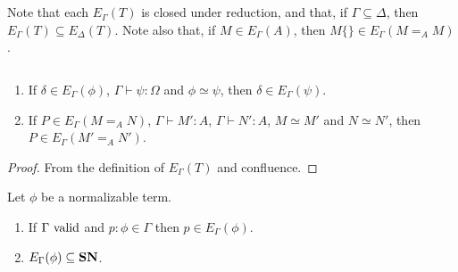 {\begin{code}
\\
\>[11]\<[19]%
\>[19]   \AgdaSymbol{(} \AgdaSymbol{:}   \AgdaSymbol{)} \AgdaSymbol{(} \AgdaSymbol{:}  \AgdaSymbol{)}                   \AgdaSymbol{(} \AgdaSymbol{(}   \AgdaSymbol{)} \AgdaSymbol{))} \<%
\\
\>[11]\<[19]%
\>[19]  \AgdaSymbol{(}  \AgdaSymbol{)} \<%
\end{code}
}

Note that each $E_\Gamma(T)$ is closed under reduction, and that, if $\Gamma \subseteq \Delta$, then $E_\Gamma(T) \subseteq E_\Delta(T)$.  Note also that, if $M \in E_\Gamma(A)$,
then $M \{\} \in E_\Gamma(M =_A M)$.

\begin{lm}$ $
\label{lm:conv-compute}
\begin{enumerate}
\item
If $\delta \in E_\Gamma(\phi)$, $\Gamma \vdash \psi : \Omega$ and $\phi \simeq \psi$, then $\delta \in E_\Gamma(\psi)$.
\item
If $P \in E_\Gamma(M =_A N)$, $\Gamma \vdash M' : A$, $\Gamma \vdash N' : A$, $M \simeq M'$ and $N \simeq N'$,
then $P \in E_\Gamma(M' =_A N')$.
\end{enumerate}
\end{lm}

\begin{proof}
From the definition of $E_\Gamma(T)$ and confluence.
\end{proof}

\begin{lm}
\label{lm:varcompute1}
Let $\phi$ be a normalizable term.
\begin{enumerate}
\item
If $\Gamma \ \mathrm{valid}$ and $p : \phi \in \Gamma$ then $p \in E_\Gamma(\phi)$.
\item
$E_\Gamma(\phi) \subseteq \mathbf{SN}$.
\end{enumerate}
\end{lm}

